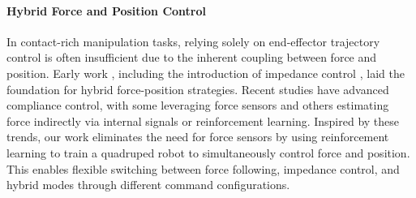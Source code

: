 \documentclass{article}
\begin{document}
\paragraph{Hybrid Force and Position Control}
In contact-rich manipulation tasks, relying solely on end-effector trajectory control is often insufficient due to the inherent coupling between force and position. Early work \cite{raibert1981hybrid,mason1981compliance,yoshikawa1987dynamic,hogan1984impedance}, including the introduction of impedance control \cite{hogan1984impedance}, laid the foundation for hybrid force-position strategies. Recent studies \cite{hwangbo2019learning,zhang2021learning,hou2024adaptive,de2024current,portela2024learning} have advanced compliance control, with some leveraging force sensors and others estimating force indirectly via internal signals or reinforcement learning. Inspired by these trends, our work eliminates the need for force sensors by using reinforcement learning to train a quadruped robot to simultaneously control force and position. This enables flexible switching between force following, impedance control, and hybrid modes through different command configurations.

\end{document}
